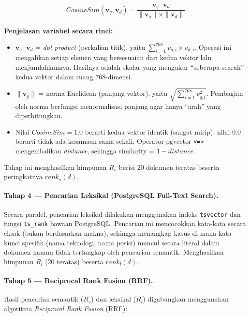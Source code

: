 \begin{equation}
  CosineSim(\mathbf{v}_q, \mathbf{v}_d) = \frac{\mathbf{v}_q \cdot \mathbf{v}_d}
  {\|\mathbf{v}_q\| \times \|\mathbf{v}_d\|}
  \label{eq:cosine_bab3}
\end{equation}

\noindent \textbf{Penjelasan variabel secara rinci:}
\begin{itemize}
  \item $\mathbf{v}_q \cdot \mathbf{v}_d$ = \textit{dot product} (perkalian titik),
    yaitu $\sum_{i=1}^{768} v_{q,i} \times v_{d,i}$. Operasi ini mengalikan setiap
    elemen yang bersesuaian dari kedua vektor lalu menjumlahkannya. Hasilnya adalah
    skalar yang mengukur ``seberapa searah'' kedua vektor dalam ruang 768-dimensi.
  \item $\|\mathbf{v}_q\|$ = norma Euclidean (panjang vektor),
    yaitu $\sqrt{\sum_{i=1}^{768} v_{q,i}^2}$. Pembagian oleh norma berfungsi
    menormalisasi panjang agar hanya ``arah'' yang diperhitungkan.
  \item Nilai $CosineSim = 1.0$ berarti kedua vektor identik (sangat mirip);
    nilai $0.0$ berarti tidak ada kesamaan sama sekali. Operator pgvector
    \texttt{<=>} mengembalikan \textit{distance}, sehingga similarity = $1 - distance$.
\end{itemize}

Tahap ini menghasilkan himpunan $R_s$ berisi 20 dokumen teratas beserta peringkatnya
$rank_s(d)$.

\paragraph{Tahap 4 --- Pencarian Leksikal (PostgreSQL Full-Text Search).}
Secara paralel, pencarian leksikal dilakukan menggunakan indeks \texttt{tsvector}
dan fungsi \texttt{ts\_rank} bawaan PostgreSQL. Pencarian ini mencocokkan kata-kata
secara eksak (bukan berdasarkan makna), sehingga menangkap kasus di mana kata kunci
spesifik (nama teknologi, nama posisi) muncul secara literal dalam dokumen namun
tidak tertangkap oleh pencarian semantik. Menghasilkan himpunan $R_l$ (20 teratas)
beserta $rank_l(d)$.

\paragraph{Tahap 5 --- Reciprocal Rank Fusion (RRF).}
Hasil pencarian semantik ($R_s$) dan leksikal ($R_l$) digabungkan menggunakan
algoritma \textit{Reciprocal Rank Fusion} (RRF):


